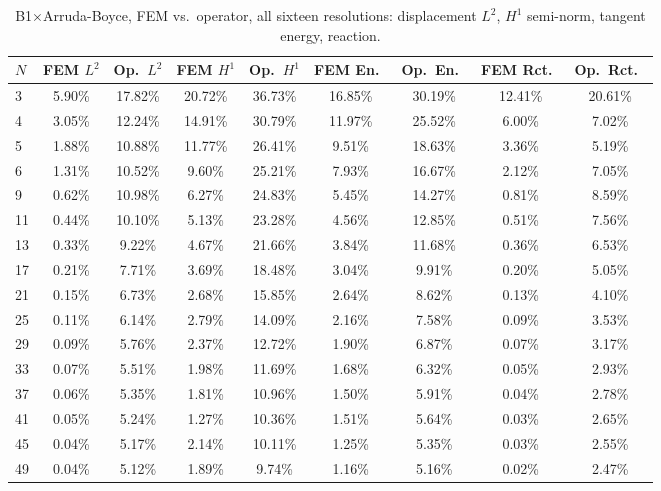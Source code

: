 \documentclass[11pt]{article}
\begin{document}
\begin{table}[h]
\centering
\caption{B1$\times$Arruda-Boyce, FEM vs.\ operator, all sixteen
  resolutions: displacement $L^2$, $H^1$ semi-norm, tangent energy,
  reaction.}
\label{tab:s2-b1ab-a}
\scriptsize
\begin{tabular}{lcccccccc}
\toprule
$N$ & FEM $L^2$ & Op.\ $L^2$ & FEM $H^1$ & Op.\ $H^1$ & FEM En.\ & Op.\ En.\ & FEM Rct.\ & Op.\ Rct.\ \\
\midrule
3  & 5.90\% & 17.82\% & 20.72\% & 36.73\% & 16.85\% & 30.19\% & 12.41\% & 20.61\% \\
4  & 3.05\% & 12.24\% & 14.91\% & 30.79\% & 11.97\% & 25.52\% & 6.00\%  & 7.02\%  \\
5  & 1.88\% & 10.88\% & 11.77\% & 26.41\% & 9.51\%  & 18.63\% & 3.36\%  & 5.19\%  \\
6  & 1.31\% & 10.52\% & 9.60\%  & 25.21\% & 7.93\%  & 16.67\% & 2.12\%  & 7.05\%  \\
9  & 0.62\% & 10.98\% & 6.27\%  & 24.83\% & 5.45\%  & 14.27\% & 0.81\%  & 8.59\%  \\
11 & 0.44\% & 10.10\% & 5.13\%  & 23.28\% & 4.56\%  & 12.85\% & 0.51\%  & 7.56\%  \\
13 & 0.33\% & 9.22\%  & 4.67\%  & 21.66\% & 3.84\%  & 11.68\% & 0.36\%  & 6.53\%  \\
17 & 0.21\% & 7.71\%  & 3.69\%  & 18.48\% & 3.04\%  & 9.91\%  & 0.20\%  & 5.05\%  \\
21 & 0.15\% & 6.73\%  & 2.68\%  & 15.85\% & 2.64\%  & 8.62\%  & 0.13\%  & 4.10\%  \\
25 & 0.11\% & 6.14\%  & 2.79\%  & 14.09\% & 2.16\%  & 7.58\%  & 0.09\%  & 3.53\%  \\
29 & 0.09\% & 5.76\%  & 2.37\%  & 12.72\% & 1.90\%  & 6.87\%  & 0.07\%  & 3.17\%  \\
33 & 0.07\% & 5.51\%  & 1.98\%  & 11.69\% & 1.68\%  & 6.32\%  & 0.05\%  & 2.93\%  \\
37 & 0.06\% & 5.35\%  & 1.81\%  & 10.96\% & 1.50\%  & 5.91\%  & 0.04\%  & 2.78\%  \\
41 & 0.05\% & 5.24\%  & 1.27\%  & 10.36\% & 1.51\%  & 5.64\%  & 0.03\%  & 2.65\%  \\
45 & 0.04\% & 5.17\%  & 2.14\%  & 10.11\% & 1.25\%  & 5.35\%  & 0.03\%  & 2.55\%  \\
49 & 0.04\% & 5.12\%  & 1.89\%  & 9.74\%  & 1.16\%  & 5.16\%  & 0.02\%  & 2.47\%  \\
\bottomrule
\end{tabular}
\end{table}
\end{document}
